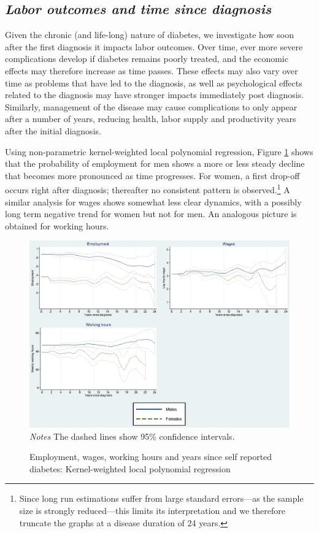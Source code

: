 \documentclass[12pt,english]{article}
\begin{document}
\subsection{\label{sec:duration}\textit{Labor outcomes and time since diagnosis}}

Given the chronic (and life-long) nature of diabetes, we investigate how soon after the first diagnosis it impacts labor outcomes. Over time, ever more severe complications develop if diabetes remains poorly treated, and the economic effects may therefore increase as time passes. These effects may also vary over time as problems that have led to the diagnosis, as well as psychological effects related to the diagnosis may have stronger impacts immediately post diagnosis. Similarly, management of the disease may cause complications to only appear after a number of years, reducing health, labor supply and productivity years after the initial diagnosis.


Using non-parametric kernel-weighted local polynomial regression, Figure \ref{fig:Kernel-weighted-local-polynomial_comb} shows that the probability of employment for men shows a more or less steady decline that becomes more pronounced as time progresses. For women,
a first drop-off occurs right after diagnosis; thereafter no consistent pattern is observed.\footnote{Since long run estimations suffer from large standard errors---as the sample size is strongly reduced---this limits its interpretation and we therefore truncate the graphs at a disease duration of 24 years.} A similar analysis for wages shows somewhat less clear dynamics, with a possibly long term negative trend for women but not for men. An analogous picture is obtained for working hours.

\begin{figure}[h!]
\caption{\label{fig:Kernel-weighted-local-polynomial_comb}Employment, wages, working hours and years since self reported diabetes:  Kernel-weighted local polynomial regression}%
\begin{center}
\includegraphics[width=\linewidth]{figures/lpoly_combined.eps}\\
\footnotesize{\textit{Notes} The dashed lines show 95\% confidence intervals.}
\end{center}
\end{figure}
\end{document}
